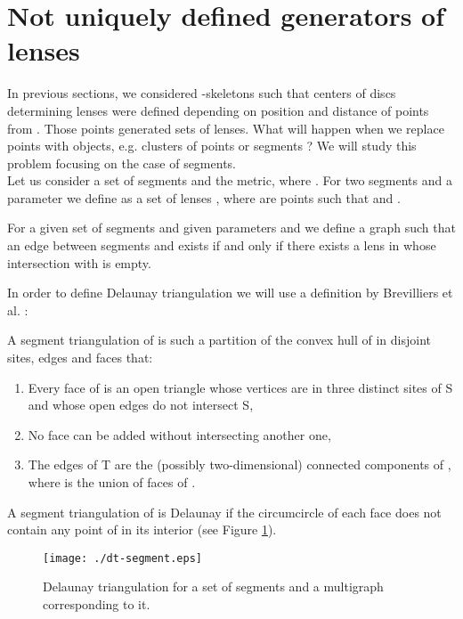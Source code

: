 \documentclass[11pt]{llncs}
\begin{document}
\section{Not uniquely defined generators of lenses} 

In previous sections, we considered -skeletons such that centers of discs determining lenses
were defined depending on position and distance of points from . Those points generated sets
of lenses. What will happen when we replace points with objects, e.g. clusters of points or segments ?
We will study this problem focusing on the case of segments. \\ 

Let us consider a set  of  segments and the  metric, where .
For two segments  and a parameter  we define 
as a set of lenses , where  are points such that  
and . 

\begin{definition}
\label{betaskeleton3}
For a given set of segments  and given parameters  and  
we define a graph such that an edge between segments  and  exists 
if and only if there exists a lens in  whose intersection
with  is empty. 
\end{definition}

In order to define Delaunay triangulation we will use a definition by Brevilliers et al. \cite{bcs08}:
\begin{definition}
A segment triangulation  of  is such a partition of the convex hull  of  
in disjoint sites, edges and faces that: 
\begin{enumerate}
\item Every face of  is an open triangle whose vertices are in three distinct sites 
of S and whose open edges do not intersect S,
\item No face can be added without intersecting another one,
\item The edges of T are the (possibly two-dimensional) connected components of , where   is the union of faces of .
\end{enumerate} 
\end{definition}

A segment triangulation of  is Delaunay  if the circumcircle of each face does not contain 
any point of  in its interior (see Figure \ref{fig:segments}). 

\begin{figure}[htbp]
\centering
\texttt{[image: ./dt-segment.eps]}
\caption{Delaunay triangulation for a set of segments and a multigraph corresponding to it.}
\label{fig:segments}
\end{figure}
\end{document}
